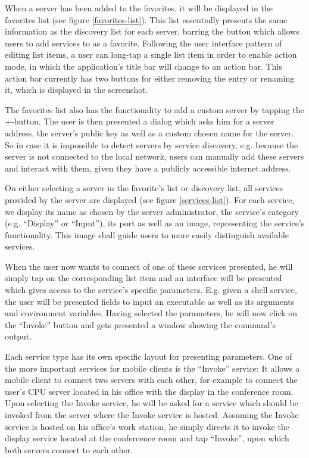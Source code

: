 When a server has been added to the favorites, it will be displayed in the favorites list (see figure \ref{favorites-list}).
This list essentially presents the same information as the discovery list for each server, barring the button which allows users to add services to as a favorite.
Following the user interface pattern of editing list items, a user can long-tap a single list item in order to enable action mode, in which the application's title bar will change to an action bar.
This action bar currently has two buttons for either removing the entry or renaming it, which is displayed in the screenshot.

The favorites list also has the functionality to add a custom server by tapping the $+$-button.
The user is then presented a dialog which asks him for a server address, the server's public key as well as a custom chosen name for the server.
So in case it is impossible to detect servers by service discovery, e.g. because the server is not connected to the local network, users can manually add these servers and interact with them, given they have a publicly accessible internet address.

On either selecting a server in the favorite's list or discovery list, all services provided by the server are displayed (see figure \ref{services-list}).
For each service, we display its name as chosen by the server administrator, the service's category (e.g. ``Display'' or ``Input''), its port as well as an image, representing the service's functionality.
This image shall guide users to more easily distinguish available services.

When the user now wants to connect of one of these services presented, he will simply tap on the corresponding list item and an interface will be presented which gives access to the service's specific parameters.
E.g. given a shell service, the user will be presented fields to input an executable as well as its arguments and environment variables.
Having selected the parameters, he will now click on the ``Invoke'' button and gets presented a window showing the command's output.

Each service type has its own specific layout for presenting parameters.
One of the more important services for mobile clients is the ``Invoke'' service:
It allows a mobile client to connect two servers with each other, for example to connect the user's CPU server located in his office with the display in the conference room.
Upon selecting the Invoke service, he will be asked for a service which should be invoked from the server where the Invoke service is hosted.
Assuming the Invoke service is hosted on his office's work station, he simply directs it to invoke the display service located at the confercence room and tap ``Invoke'', upon which both servers connect to each other.

